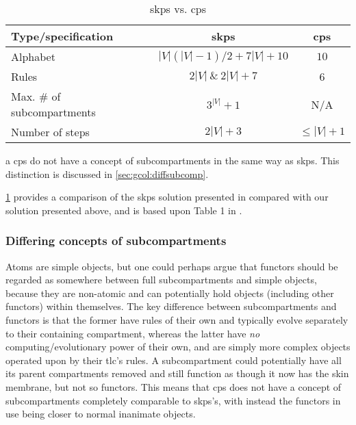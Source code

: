 \begin{table}
\begin{threeparttable}
\centering
\caption{\acrlong{skps} vs. \gls{cps}}
\label{tab:gcol:skpcomp}
\begin{tabular}{@{}lcc@{}}
\toprule
Type/specification                & \gls{skps}        & \gls{cps} \\ \midrule
Alphabet                          & \(|V|(|V|-1)/2 + 7|V| + 10\) & \(10\)         \\
Rules                             & \(2|V|~\&~2|V| + 7\)       & 6          \\
Max. \# of subcompartments & \(3^|V| + 1\)             & N/A\tnote{a}          \\
Number of steps                   & \(2|V| + 3\)             & \(\leq |V| + 1\)         \\ \bottomrule
\end{tabular}%
\begin{tablenotes}
\item[a] \gls{cps} do not have a concept of subcompartments in the same way as \gls{skps}.  This distinction is discussed in \cref{sec:gcol:diffsubcomp}.
\end{tablenotes}
\end{threeparttable}
\end{table}


\cref{tab:gcol:skpcomp} provides a comparison of the \gls{skps} solution presented in \cite{Gheorghe2013} compared with our solution presented above, and is based upon Table 1 in \cite{Gheorghe2013}.  

\subsubsection{\label{sec:gcol:diffsubcomp}Differing concepts of subcompartments}
Atoms are simple objects, but one could perhaps argue that functors should be regarded as somewhere between full subcompartments and simple objects, because they are non-atomic and can potentially hold objects (including other functors) within themselves.  The key difference between subcompartments and functors is that the former have rules of their own and typically evolve separately to their containing compartment, whereas the latter have \emph{no} computing/evolutionary power of their own, and are simply more complex objects operated upon by their \gls{tlc}'s rules.  A subcompartment could potentially have all its parent compartments removed and still function as though it now has the skin membrane, but not so functors.  This means that \gls{cps} does not have a concept of subcompartments completely comparable to \gls{skps}'s, with instead the functors in use being closer to normal inanimate objects.

